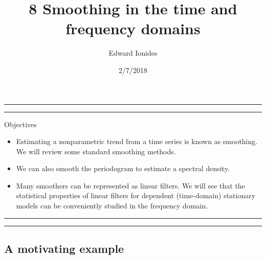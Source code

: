 \documentclass[]{article}
\title{8 Smoothing in the time and frequency domains}
\author{Edward Ionides}
\date{2/7/2018}
\begin{document}
\maketitle

{
\setcounter{tocdepth}{2}
\tableofcontents
}
\newcommand\prob{\mathbb{P}}
\newcommand\E{\mathbb{E}}
\newcommand\var{\mathrm{Var}}
\newcommand\cov{\mathrm{Cov}}
\newcommand\loglik{\ell}
\newcommand\R{\mathbb{R}}
\newcommand\data[1]{#1^*}
\newcommand\params{\, ; \,}
\newcommand\transpose{\scriptsize{T}}
\newcommand\eqspace{\quad\quad\quad}
\newcommand\lik{\mathscr{L}}
\newcommand\profileloglik[1]{\ell^\mathrm{profile}_#1}
\newcommand\ar{\phi}
\newcommand\ma{\psi}
\newcommand\AR{\Phi}
\newcommand\MA{\Psi}
\newcommand\ev{u}





\begin{center}\rule{0.5\linewidth}{\linethickness}\end{center}

\begin{center}\rule{0.5\linewidth}{\linethickness}\end{center}

Objectives

\begin{itemize}
\item
  Estimating a nonparametric trend from a time series is known as
  smoothing. We will review some standard smoothing methods.
\item
  We can also smooth the periodogram to estimate a spectral density.
\item
  Many smoothers can be represented as linear filters. We will see that
  the statistical properties of linear filters for dependent
  (time-domain) stationary models can be conveniently studied in the
  frequency domain.
\end{itemize}

\begin{center}\rule{0.5\linewidth}{\linethickness}\end{center}

\begin{center}\rule{0.5\linewidth}{\linethickness}\end{center}

\subsection{A motivating example}\label{a-motivating-example}
\end{document}
